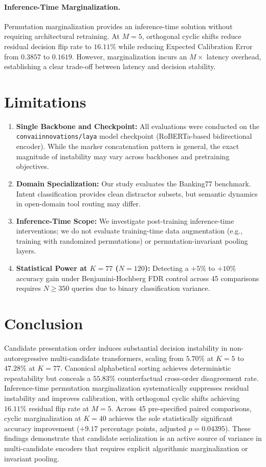 \documentclass[10pt]{article}
\begin{document}
\paragraph{Inference-Time Marginalization.}
Permutation marginalization provides an inference-time solution without requiring architectural retraining. At $M=5$, orthogonal cyclic shifts reduce residual decision flip rate to $16.11\%$ while reducing Expected Calibration Error from $0.3857$ to $0.1619$. However, marginalization incurs an $M\times$ latency overhead, establishing a clear trade-off between latency and decision stability.

\section{Limitations}

\begin{enumerate}
    \item \textbf{Single Backbone and Checkpoint:} All evaluations were conducted on the \nolinkurl{convaiinnovations/laya} model checkpoint (RoBERTa-based bidirectional encoder). While the marker concatenation pattern is general, the exact magnitude of instability may vary across backbones and pretraining objectives.
    \item \textbf{Domain Specialization:} Our study evaluates the Banking77 benchmark. Intent classification provides clean distractor subsets, but semantic dynamics in open-domain tool routing may differ.
    \item \textbf{Inference-Time Scope:} We investigate post-training inference-time interventions; we do not evaluate training-time data augmentation (e.g., training with randomized permutations) or permutation-invariant pooling layers.
    \item \textbf{Statistical Power at $K=77$ ($N=120$):} Detecting a $+5\%$ to $+10\%$ accuracy gain under Benjamini-Hochberg FDR control across 45 comparisons requires $N \ge 350$ queries due to binary classification variance.
\end{enumerate}

\section{Conclusion}

Candidate presentation order induces substantial decision instability in non-autoregressive multi-candidate transformers, scaling from $5.70\%$ at $K=5$ to $47.28\%$ at $K=77$. Canonical alphabetical sorting achieves deterministic repeatability but conceals a $55.83\%$ counterfactual cross-order disagreement rate. Inference-time permutation marginalization systematically suppresses residual instability and improves calibration, with orthogonal cyclic shifts achieving $16.11\%$ residual flip rate at $M=5$. Across 45 pre-specified paired comparisons, cyclic marginalization at $K=40$ achieves the sole statistically significant accuracy improvement ($+9.17$ percentage points, adjusted $p=0.04395$). These findings demonstrate that candidate serialization is an active source of variance in multi-candidate encoders that requires explicit algorithmic marginalization or invariant pooling.
\end{document}
